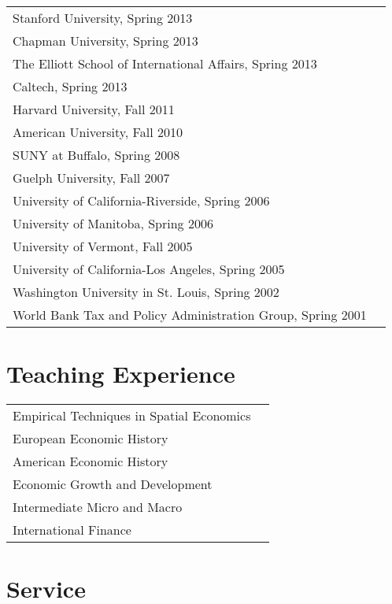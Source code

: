 \documentclass[11pt,fullpage]{article}
\begin{document}
\begin{tabular}{ll}
	Stanford University, Spring 2013 \\
	Chapman University, Spring 2013 \\
	The Elliott School of International Affairs, Spring 2013 \\
	Caltech, Spring 2013 \\
	Harvard University, Fall 2011 \\
	American University, Fall 2010 \\
	SUNY at Buffalo, Spring 2008 \\
	Guelph University, Fall 2007 \\
	University of California-Riverside, Spring 2006 \\
	University of Manitoba, Spring 2006 \\
	University of Vermont, Fall 2005 \\
	University of California-Los Angeles, Spring 2005 \\
	Washington University in St. Louis, Spring 2002 \\
	World Bank Tax and Policy Administration Group, Spring 2001 \\
\end{tabular}


\section*{Teaching Experience}

\begin{tabular}{ll}
	Empirical Techniques in Spatial Economics \\
	European Economic History  \\
	American Economic History  \\ 
	Economic Growth and Development \\
	Intermediate Micro and Macro \\
	International Finance \\
\end{tabular}


\section*{Service}
\end{document}
